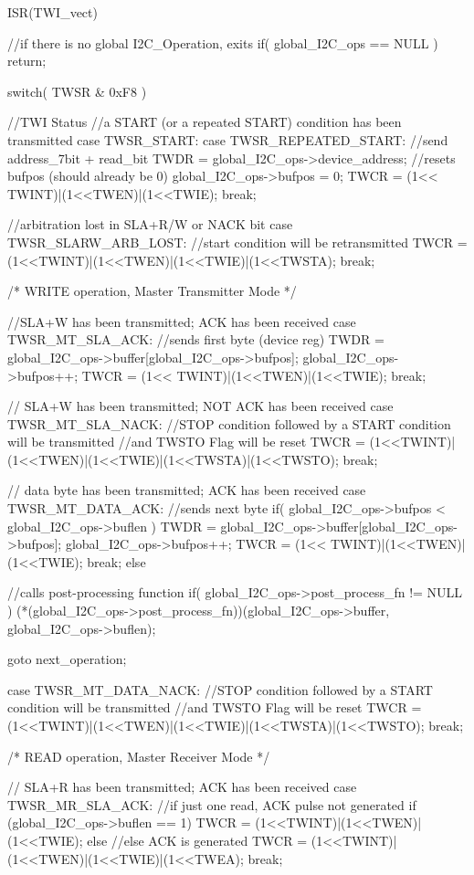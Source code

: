 \begin{ccode}
	ISR(TWI_vect) {
		//if there is no global I2C_Operation, exits
		if( global_I2C_ops == NULL )
			return;
	
		switch( TWSR & 0xF8 ) {	//TWI Status
			//a START (or a repeated START) condition has been transmitted
			case TWSR_START:
			case TWSR_REPEATED_START:
				//send address_7bit + read_bit
				TWDR = global_I2C_ops->device_address;
				//resets bufpos (should already be 0)
				global_I2C_ops->bufpos = 0;
				TWCR = (1<< TWINT)|(1<<TWEN)|(1<<TWIE);
				break;
		
			//arbitration lost in SLA+R/W or NACK bit
			case TWSR_SLARW_ARB_LOST:
				//start condition will be retransmitted
				TWCR = (1<<TWINT)|(1<<TWEN)|(1<<TWIE)|(1<<TWSTA);
				break;
		
		/* WRITE operation, Master Transmitter Mode */
	
			//SLA+W has been transmitted; ACK has been received
			case TWSR_MT_SLA_ACK:
				//sends first byte (device reg)
				TWDR = global_I2C_ops->buffer[global_I2C_ops->bufpos];
				global_I2C_ops->bufpos++;
				TWCR = (1<< TWINT)|(1<<TWEN)|(1<<TWIE);
				break;
		
			// SLA+W has been transmitted; NOT ACK has been received
			case TWSR_MT_SLA_NACK:
				//STOP condition followed by a START condition will be transmitted
					//and TWSTO Flag will be reset
				TWCR = (1<<TWINT)|(1<<TWEN)|(1<<TWIE)|(1<<TWSTA)|(1<<TWSTO);
				break;
		
			// data byte has been transmitted; ACK has been received
			case TWSR_MT_DATA_ACK:
				//sends next byte
				if( global_I2C_ops->bufpos < global_I2C_ops->buflen ) {
					TWDR = global_I2C_ops->buffer[global_I2C_ops->bufpos];
					global_I2C_ops->bufpos++;
					TWCR = (1<< TWINT)|(1<<TWEN)|(1<<TWIE);
					break;
				} else {
					//calls post-processing function
					if( global_I2C_ops->post_process_fn != NULL )
						(*(global_I2C_ops->post_process_fn))(global_I2C_ops->buffer, global_I2C_ops->buflen);
				
					goto next_operation;
				}
			
			case TWSR_MT_DATA_NACK:
				//STOP condition followed by a START condition will be transmitted
					//and TWSTO Flag will be reset
				TWCR = (1<<TWINT)|(1<<TWEN)|(1<<TWIE)|(1<<TWSTA)|(1<<TWSTO);
				break;

		/* READ operation, Master Receiver Mode */
		
			// SLA+R has been transmitted; ACK has been received
			case TWSR_MR_SLA_ACK:
				//if just one read, ACK pulse not generated
				if (global_I2C_ops->buflen == 1)
					TWCR = (1<<TWINT)|(1<<TWEN)|(1<<TWIE);
				else 	//else ACK is generated
					TWCR = (1<<TWINT)|(1<<TWEN)|(1<<TWIE)|(1<<TWEA);
				break;
		
}}
\end{ccode}
